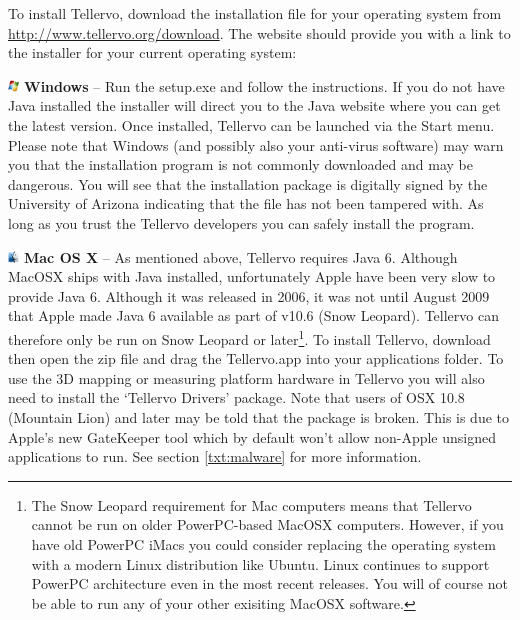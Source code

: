 To install Tellervo, download the installation file for your operating system from \url{http://www.tellervo.org/download}. The website should provide you with a link to the installer for your current operating system:

\begin{description}
\item \includegraphics[width=3mm]{Images/windows.png} \textbf{Windows} -- Run the setup.exe and follow the instructions. If you do not have Java installed the installer will direct you to the Java website where you can get the latest version. Once installed, Tellervo can be launched via the Start menu.  Please note that Windows (and possibly also your anti-virus software) may warn you that the installation program is not commonly downloaded and may be dangerous.  You will see that the installation package is digitally signed by the University of Arizona indicating that the file has not been tampered with.  As long as you trust the Tellervo developers you can safely install the program.

\item \includegraphics[width=3mm]{Images/mac.png} \textbf{Mac OS X} -- As mentioned above, Tellervo requires Java 6. Although MacOSX ships with Java installed, unfortunately Apple have been very slow to provide Java 6. Although it was released in 2006, it was not until August 2009 that Apple made Java 6 available as part of v10.6 (Snow Leopard). Tellervo can therefore only be run on Snow Leopard or later\footnote{The Snow Leopard requirement for Mac computers means that Tellervo cannot be run on older PowerPC-based MacOSX computers.  However, if you have old PowerPC iMacs you could consider replacing the operating system with a modern Linux distribution like Ubuntu.  Linux continues to support PowerPC architecture even in the most recent releases.  You will of course not be able to run any of your other exisiting MacOSX software.}. To install Tellervo, download then open the zip file and drag the Tellervo.app into your applications folder.  To use the 3D mapping or measuring platform hardware in Tellervo you will also need to install the `Tellervo Drivers' package.  Note that users of OSX 10.8 (Mountain Lion) and later may be told that the package is broken.  This is due to Apple's new GateKeeper tool which by default won't allow non-Apple unsigned applications to run.  See section \ref{txt:malware} for more information.   


\end{description}
